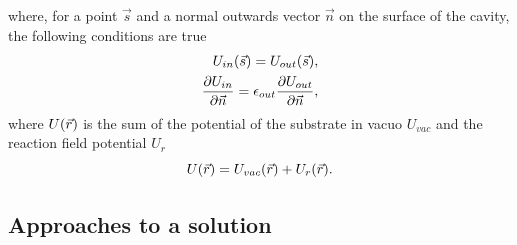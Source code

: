 \documentclass[../Thesis.tex]{subfiles}
\begin{document}
where, for a point $\vec{s}$ and a normal outwards vector $\vec{n}$ on the
surface of the cavity, the following conditions are true
\cite{Sorland, Tomasi:1994wt}
\begin{align}
  \begin{split}
    U_{in}(\vec{s}) = U_{out}(\vec{s}),\\
    \frac{\partial U_{in}}{\partial\vec{n}} = \epsilon_{out}\frac{\partial U_{out}}{\partial\vec{n}},
  \end{split}
\end{align}
where $U(\vec{r})$ is the sum of the potential of the substrate in vacuo
$U_{vac}$ and the reaction field potential $U_r$\cite{Sorland, FossoTande:2013ka}
\begin{equation}\label{eq:Utot}
  U(\vec{r}) = U_{vac}(\vec{r}) + U_r(\vec{r}).
\end{equation}

\subsection{Approaches to a solution}\label{approchessolv}
\end{document}
